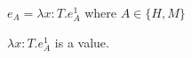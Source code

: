 \begin{case}
$e_{A}=\lambda x:T.e_{A}^{1}$ where $A\in\lbrace H,M\rbrace$

$\lambda x:T.e_{A}^{1}$ is a value.
\end{case}